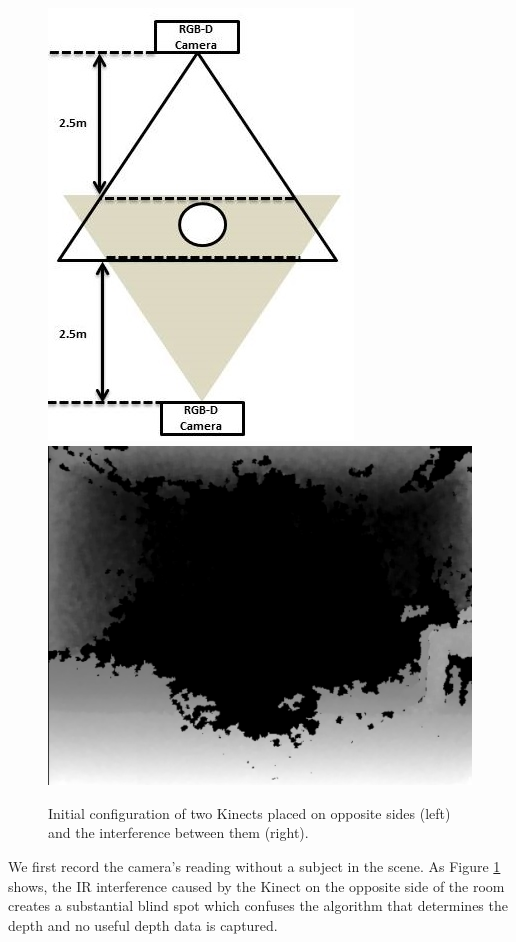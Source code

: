 \documentclass[11pt,a4paper]{article}
\begin{document}
\begin{figure}[H]
\centering
\includegraphics[scale=0.4]{figure_2cameras_opposite.jpg}
\includegraphics[scale=0.16]{IR_Interference2.jpg}
\caption{Initial configuration of two Kinects placed on opposite sides (left) and the interference between them (right).}
\label{2_cameras_config1}
\end{figure}

\noindent
We first record the camera's reading without a subject in the scene. As Figure \ref{2_cameras_config1} shows, the IR interference caused by the Kinect on the opposite side of the room creates a substantial blind spot which confuses the algorithm that determines the depth and no useful depth data is captured.
 
\end{document}
